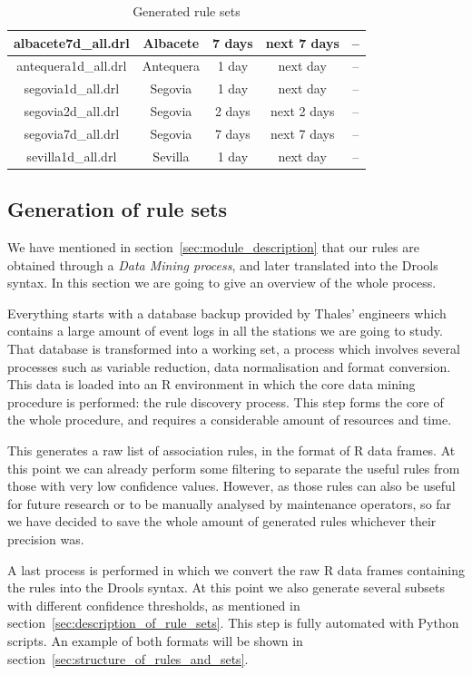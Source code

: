 \documentclass[a4paper,12pt]{article}
\begin{document}
\begin{table}
\begin{center}
\begin{tabular}{|c|c|c|c|c|}
\hline  
albacete7d\_all.drl & Albacete & 7 days & next 7 days & -- \\ 
\hline 
antequera1d\_all.drl & Antequera & 1 day & next day & -- \\ 
\hline 
segovia1d\_all.drl & Segovia & 1 day & next day & -- \\ 
\hline
segovia2d\_all.drl & Segovia & 2 days & next 2 days & -- \\  
\hline 
segovia7d\_all.drl & Segovia & 7 days & next 7 days & -- \\  
\hline 
sevilla1d\_all.drl & Sevilla & 1 day & next day & -- \\ 
\hline

\end{tabular} 
\caption{Generated rule sets} \label{tab:ruleset_list}
\end{center}
\end{table}

\subsection{Generation of rule sets}
\label{sec:generation_of_rule_sets}

We have mentioned in section~\ref{sec:module_description} that our rules are obtained through a \emph{Data Mining process}, and later translated into the Drools syntax. In this section we are going to give an overview of the whole process.

Everything starts with a database backup provided by Thales' engineers which contains a large amount of event logs in all the stations we are going to study. That database is transformed into a working set, a process which involves several processes such as variable reduction, data normalisation and format conversion. This data is loaded into an R\cite{ihaka1996r, torgo2003data} environment in which the core data mining procedure is performed: the rule discovery process. This step forms the core of the whole procedure, and requires a considerable amount of resources and time.

This generates a raw list of association rules, in the format of R data frames. At this point we can already perform some filtering to separate the useful rules from those with very low confidence values. However, as those rules can also be useful for future research or to be manually analysed by maintenance operators, so far we have decided to save the whole amount of generated rules whichever their precision was.

A last process is performed in which we convert the raw R data frames\cite{ihaka1996r} containing the rules into the Drools syntax. At this point we also generate several subsets with different confidence thresholds, as mentioned in section~\ref{sec:description_of_rule_sets}. This step is fully automated with Python\cite{sanner1999python} scripts. An example of both formats will be shown in section~\ref{sec:structure_of_rules_and_sets}.
\end{document}
